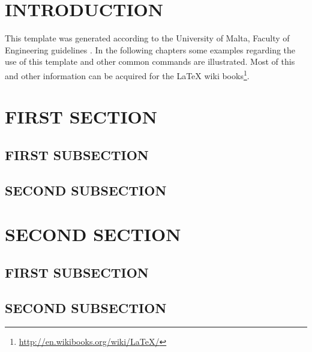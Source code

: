 

\begin{multicols}{2} %

\section{INTRODUCTION}

This template was generated according to the University of Malta, Faculty of Engineering guidelines \cite{guidelines}. In the following chapters some examples regarding the use of this template and other common commands are illustrated. Most of this and other information can be acquired for the \LaTeX{} wiki books\footnote{\url{http://en.wikibooks.org/wiki/LaTeX/}}.

\section{FIRST SECTION}
\label{sec:sec1}

\lipsum[2]

\subsection{FIRST SUBSECTION} 
\label{ssec:ssec1.1}

\lipsum[3]

\subsection{SECOND SUBSECTION}
\label{ssec:ssec1.2}

\lipsum[1]

\section{SECOND SECTION}

\lipsum[5]

\subsection{FIRST SUBSECTION}

\lipsum[2]

\subsection{SECOND SUBSECTION}


\end{multicols}
